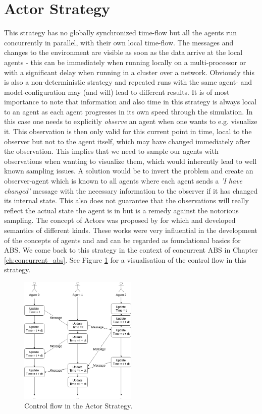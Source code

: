 \section{Actor Strategy}
This strategy has no globally synchronized time-flow but all the agents run concurrently in parallel, with their own local time-flow. The messages and changes to the environment are visible as soon as the data arrive at the local agents - this can be immediately when running locally on a multi-processor or with a significant delay when running in a cluster over a network. Obviously this is also a non-deterministic strategy and repeated runs with the same agent- and model-configuration may (and will) lead to different results. It is of most importance to note that information and also time in this strategy is always local to an agent as each agent progresses in its own speed through the simulation. In this case one needs to explicitly \textit{observe} an agent when one wants to e.g. visualize it. This observation is then only valid for this current point in time, local to the observer but not to the agent itself, which may have changed immediately after the observation. This implies that we need to sample our agents with observations when wanting to visualize them, which would inherently lead to well known sampling issues. A solution would be to invert the problem and create an observer-agent which is known to all agents where each agent sends a \textit{'I have changed'} message with the necessary information to the observer if it has changed its internal state. This also does not guarantee that the observations will really reflect the actual state the agent is in but is a remedy against the notorious sampling. The concept of Actors was proposed by \cite{hewitt_universal_1973} for which \cite{grief_semantics_1975} and \cite{clinger_foundations_1981} developed semantics of different kinds. These works were very influential in the development of the concepts of agents and and can be regarded as foundational basics for ABS. We come back to this strategy in the context of concurrent ABS in Chapter \ref{ch:concurrent_abs}. See Figure \ref{fig:strategy_act} for a visualisation of the control flow in this strategy.

\begin{figure}[H]
	\centering
	\includegraphics[width=0.5\textwidth, angle=0]{./fig/implabs/actor.png}
	\caption{Control flow in the Actor Strategy.}
	\label{fig:strategy_act}
\end{figure}

